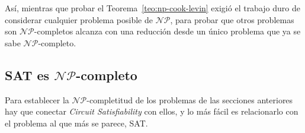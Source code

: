 \documentclass[12pt, spanish, oneside, openany]{book}
\newcommand{\NP}{\mathcal{NP}}
\newcommand{\prob}[1]{\textit{#1}}
\newcommand{\CSAT}{\prob{Circuit Satisfiability}\xspace}
\theoremstyle{uprightplain}
\theoremstyle{definition}
\theoremstyle{remark}
\theoremstyle{definition}
\begin{document}
Así, mientras que probar el Teorema~\ref{teo:np-cook-levin} exigió el trabajo duro de considerar cualquier problema posible de $\NP$, para probar que otros problemas son $\NP$-completos alcanza con una reducción desde un único problema que ya se sabe $\NP$-completo.

\subsection{\texorpdfstring{SAT es $\NP$-completo}{SAT es NP-completo}}
\label{subsec:np-sat-completo}

Para establecer la $\NP$-completitud de los problemas de las secciones anteriores hay que conectar \CSAT con ellos, y lo más fácil es relacionarlo con el problema al que más se parece, SAT.
\end{document}
